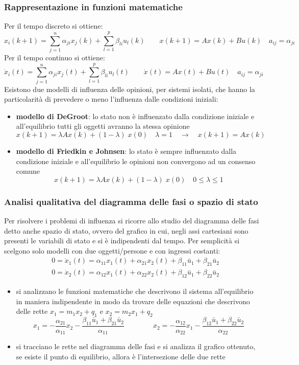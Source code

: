\subsubsection*{Rappresentazione in funzioni matematiche}
Per il tempo discreto si ottiene:
\[x_i(k+1) = \sum_{j=1}^{n} \alpha_{ji} x_j(k) + \sum_{l=1}^{p} \beta_{li} u_l(k) \qquad x(k+1) = Ax(k) + Bu(k) \quad a_{ij} = \alpha_{ji}\]
Per il tempo continuo si ottiene:
\[\dot{x}_i(t) = \sum_{j=1}^{n} \alpha_{ji} x_j(t) + \sum_{l=1}^{p} \beta_{li} u_l(t) \qquad \dot{x}(t) = Ax(t) + Bu(t) \quad a_{ij} = \alpha_{ji}\]
Esistono due modelli di influenza delle opinioni, per sistemi isolati, che hanno la particolarità di prevedere o meno l'influenza
dalle condizioni iniziali:
\begin{itemize}
	\item \textbf{modello di DeGroot}: lo stato non è influenzato dalla condizione iniziale e all'equilibrio tutti gli oggetti
	avranno la stessa opinione \[x(k+1) = \lambda A x(k) + (1-\lambda) \; x(0) \quad \lambda = 1 \quad \rightarrow \quad x(k+1) = A x(k)\]
	\item \textbf{modello di Friedkin e Johnsen}: lo stato è sempre influenzato dalla condizione iniziale e all'equilibrio le
	opinioni non convergono ad un consenso comune \[x(k+1) = \lambda A x(k) + (1-\lambda) \; x(0) \quad 0 \leq \lambda \leq 1\]
\end{itemize}

\newpage

\subsubsection*{Analisi qualitativa del diagramma delle fasi o spazio di stato}
Per risolvere i problemi di influenza si ricorre allo studio del diagramma delle fasi detto anche spazio di stato, ovvero del
grafico in cui, negli assi cartesiani sono presenti le variabili di stato e si è indipendenti dal tempo. Per semplicità si
scelgono solo modelli con due oggetti/persone e con ingressi costanti:
\begin{align*}
	&0 = \dot{x}_1(t) = \alpha_{11} x_1(t) + \alpha_{21} x_2(t) + \beta_{11} \bar{u}_1 + \beta_{21} \bar{u}_2 \\
	&0 = \dot{x}_2(t) = \alpha_{12} x_1(t) + \alpha_{22} x_2(t) + \beta_{12} \bar{u}_1 + \beta_{22} \bar{u}_2
\end{align*}
\begin{itemize}
	\item si analizzano le funzioni matematiche che descrivono il sistema all'equilibrio in maniera indipendente in modo da trovare
	delle equazioni che descrivono delle rette \(x_1 = m_1 x_2 + q_1\) e \(x_2 = m_2 x_1 + q_2\)
	\[x_1 = -\frac{\alpha_{21}}{\alpha_{11}} x_2 - \frac{\beta_{11} \bar{u}_1 + \beta_{21} \bar{u}_2}{\alpha_{11}} \qquad\qquad x_2 = -\frac{\alpha_{12}}{\alpha_{22}} x_1 - \frac{\beta_{12} \bar{u}_1 + \beta_{22} \bar{u}_2}{\alpha_{22}}\]
	\item si tracciano le rette nel diagramma delle fasi e si analizza il grafico ottenuto, se esiste il punto di equilibrio, allora
	è l'intersezione delle due rette
\end{itemize}


